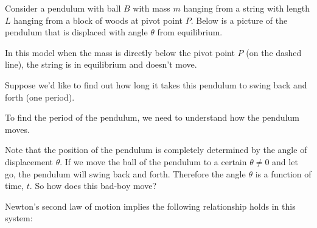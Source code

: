 \documentclass[handout,nooutcomes]{ximera}
\begin{document}
\begin{example}%
Consider a pendulum with ball $B$ with mass $m$ hanging from a string
with length $L$ hanging from a block of woods at pivot point $P$.
Below is a picture of the pendulum that is displaced with angle
$\theta$ from equilibrium.

\begin{center}
\usetikzlibrary{calc,patterns,angles,quotes}
\end{center}

In this model when the mass is directly below the pivot point $P$
(on the dashed line), the string is in equilibrium and doesn't move.

Suppose we'd like to find out how long it takes this pendulum
to swing back and forth (one period).

\begin{explanation}
To find the period of the pendulum, we need to understand how the pendulum moves.

Note that the position of the pendulum is completely determined
by the angle of displacement $\theta$. If we move the ball of the pendulum
to a certain $\theta\neq 0$ and let go, the pendulum will swing back
and forth. Therefore the angle $\theta$ is a function of time, $t$. 
So how does this bad-boy move?

Newton's second law of motion implies the following 
relationship holds in this system:


\end{explanation}
\end{example}
\end{document}
